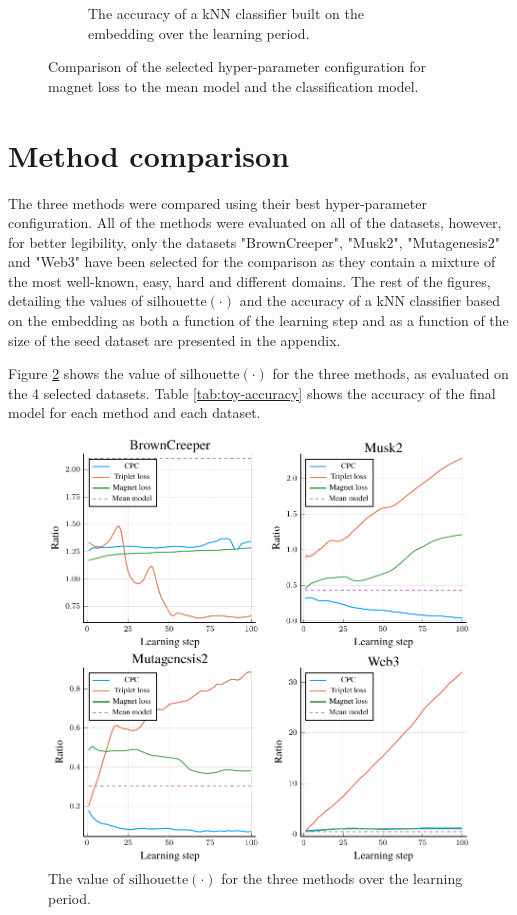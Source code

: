 \begin{figure}[h]
\begin{subfigure}[t]{0.49\textwidth}
    \caption{The accuracy of a kNN classifier built on the embedding over the learning period.}
  \end{subfigure}
  \caption{Comparison of the selected hyper-parameter configuration for magnet loss to the mean model and the classification model.}\label{fig:magnet-baseline}
\end{figure}

\section{Method comparison}
The three methods were compared using their best hyper-parameter configuration. All of the methods were evaluated on all of the datasets, however, for better legibility, only the datasets "BrownCreeper", "Musk2", "Mutagenesis2" and "Web3" have been selected for the comparison as they contain a mixture of the most well-known, easy, hard and different domains. The rest of the figures, detailing the values of \( \mathrm{silhouette} \left( \cdot \right) \) and the accuracy of a kNN classifier based on the embedding as both a function of the learning step and as a function of the size of the seed dataset are presented in the appendix.

Figure \ref{fig:toy-ratio} shows the value of \( \mathrm{silhouette} \left( \cdot \right) \) for the three methods, as evaluated on the 4 selected datasets. Table \ref{tab:toy-accuracy} shows the accuracy of the final model for each method and each dataset.

\begin{figure}[H]
  \centering
  \includegraphics[width=\textwidth]{images/toy-ratio/toy-ratio.pdf}
  \caption{The value of \( \mathrm{silhouette} \left( \cdot \right) \) for the three methods over the learning period.}\label{fig:toy-ratio}
\end{figure}

